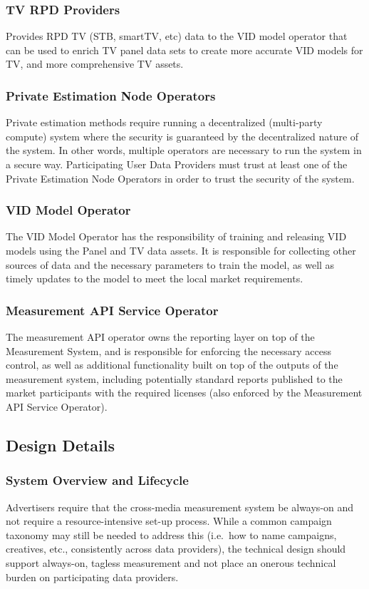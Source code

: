 \documentclass[]{article}
\begin{document}
\subsubsection{TV RPD Providers}
Provides RPD TV (STB, smartTV, etc) data to the VID model operator that can be used to enrich TV panel data sets to create more accurate VID models for TV, and more comprehensive TV assets.


\subsubsection{Private Estimation Node Operators}
Private estimation methods require running a decentralized (multi-party compute) system where the security is guaranteed by the decentralized nature of the system. In other words, multiple operators are necessary to run the system in a secure way. Participating User Data Providers must trust at least one of the Private Estimation Node Operators in order to trust the security of the system.

\subsubsection{VID Model Operator}
The VID Model Operator has the responsibility of training and releasing VID models using the Panel and TV data assets. It is responsible for collecting other sources of data and the necessary parameters to train
the model, as well as timely updates to the model to meet the local market requirements.

\subsubsection{Measurement API Service Operator}
The measurement API operator owns the reporting layer on top of the Measurement System, and is responsible for enforcing the necessary access control, as well as additional functionality built on top of the
outputs of the measurement system, including potentially standard reports published to the market participants with the required licenses (also enforced by the Measurement API Service Operator).


\subsection{Design Details}

\subsubsection{System Overview and Lifecycle}
Advertisers require that the cross-media measurement system be always-on and not require a resource-intensive set-up process. While a common campaign taxonomy may still be needed to address this (i.e.~how to name campaigns, creatives, etc., consistently across data providers), the technical design should support always-on, tagless measurement and not place an onerous technical burden on participating data providers.
\end{document}

